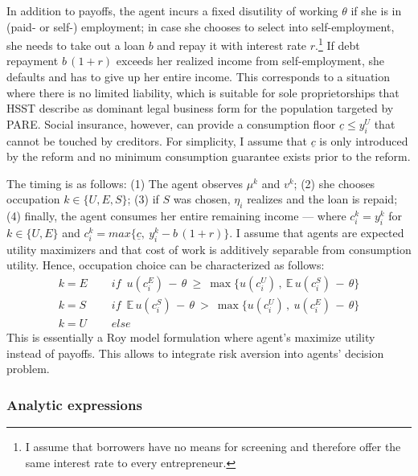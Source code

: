 In addition to payoffs, the agent incurs a fixed disutility of working $\theta$ if she is in (paid- or self-) employment; in case she chooses to select into self-employment, she needs to take out a loan $b$ and repay it with interest rate $r$.\footnote{I assume that borrowers have no means for screening and therefore offer the same interest rate to every entrepreneur.} If debt repayment $b \, (1+r)$ exceeds her realized income from self-employment, she defaults and has to give up her entire income. This corresponds to a situation where there is no limited liability, which is suitable for sole proprietorships that HSST describe as dominant legal business form for the population targeted by PARE. Social insurance, however, can provide a consumption floor $\underline{c} \leq y_i^U$ that cannot be touched by creditors. For simplicity, I assume that $\underline{c}$ is only introduced by the reform and no minimum consumption guarantee exists prior to the reform. \newline

\noindent The timing is as follows: (1) The agent observes $\mu^k$ and $v^k$; (2) she chooses occupation $k \in \{U, E, S\}$; (3) if $S$ was chosen, $\eta_i$ realizes and the loan is repaid; (4) finally, the agent consumes her entire remaining income --- where $c_i^k = y_i^k$ for $k \in \{U, E\}$ and $c_i^k =  max\{\underline{c}, \: y_i^k  - b \, (1+r)\}$. I assume that agents are expected utility maximizers and that cost of work is additively separable from consumption utility. Hence, occupation choice can be characterized as follows:
\begin{align}
k = E \quad & \textit{ if } \, u(c^E_i) \, - \, \theta \:  \geq \:  \max\bigg\{u(c_i^U) \, , \: \mathbb{E} \, u(c_i^S)  \, - \, \theta \bigg\} \\[3pt]
k = S \quad & \textit{ if }  \, \mathbb{E} \, u(c_i^S) \, - \, \theta  \:  > \:  \max\bigg\{u(c_i^U) \, , \: u(c^E_i)  \, - \, \theta \bigg\} \\[3pt]
k = U \quad & \textit{ else} 
\end{align}
This is essentially a Roy model formulation where agent's maximize utility instead of payoffs. This allows to integrate risk aversion into agents' decision problem.


\subsubsection*{Analytic expressions}

